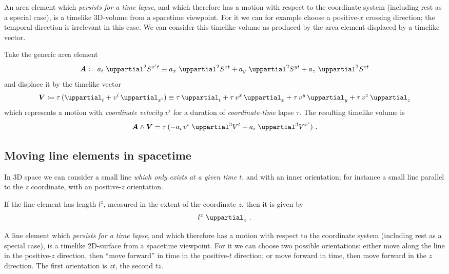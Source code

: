 \documentclass[a4paper,12pt,%
onecolumn,oneside,article,%
british%
]{memoir}
\theoremstyle{remark}
\theoremstyle{innote}
\newcommand*{\de}{\mathop{}\!\uppartial}%
\newcommand*{\defd}{\coloneqq}
\renewcommand*{\|}[1][]{\nonscript\:#1\vert\nonscript\:\mathopen{}}
\newcommand*{\se}[1]{\de_{#1}}
\newcommand*{\tte}[1]{\de^{2}S^{#1}}
\newcommand*{\ttte}[1]{\de^{3}V^{#1}}
\begin{document}
An area element which \emph{persists for a time lapse}, and which therefore has a motion with respect to the coordinate system (including rest as a special case), is a timelike 3D-volume from a spacetime viewpoint. For it we can for example choose a positive-$x$ crossing direction; the temporal direction is irrelevant in this case. We can consider this timelike volume as produced by the area element displaced by a timelike vector.

Take the generic area element
\begin{equation}
  \label{eq:area_element}
    \bm{A} \defd a_{i}\, \tte{x^{i}t}
    \equiv a_{x}\,\tte{xt} + a_{y}\,\tte{yt} + a_{z}\,\tte{zt}
\end{equation}
and displace it by the timelike vector
\begin{equation}
  \label{eq:timelike_displacement}
  \bm{V} \defd \tau\, (\se{t} + v^{i}\se{x^{i}})
  \equiv \tau\se{t}
  + \tau\,v^{x}\se{x} + \tau\,v^{y}\se{y} + \tau\,v^{z}\se{z}
\end{equation}
which represents a motion with \emph{coordinate velocity} $v^{i}$ for a duration of \emph{coordinate-time} lapse $\tau$. The resulting timelike volume is
\begin{equation}
  \label{eq:timelike_volume}
  \bm{A}\land\bm{V} =
  \tau\,(-a_{i}\,v^{i}\,\ttte{t} + a_{i}\,\ttte{x^{i}}) \ .
\end{equation}


\subsection{Moving line elements in spacetime}
\label{sec:moving_line_elements}

In 3D space we can consider a small line \emph{which only exists at a given time $t$}, and with an inner orientation; for instance a small line parallel to the $z$ coordinate, with an positive-$z$ orientation.

If the line element has length $l^{z}$, measured in the extent of the coordinate $z$, then it is given by
\begin{equation*}
  l^{z}\, \se{z} \ .
\end{equation*}

A line element which \emph{persists for a time lapse}, and which therefore has a motion with respect to the coordinate system (including rest as a special case), is a timelike 2D-surface from a spacetime viewpoint. For it we can choose two possible orientations: either move along the line in the positive-$z$ direction, then \enquote{move forward} in time in the positive-$t$ direction; or move forward in time, then move forward in the $z$ direction. The first orientation is $zt$, the second $tz$.
\end{document}

